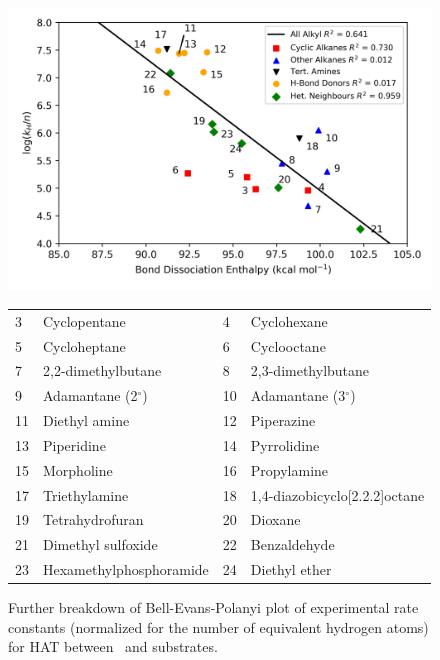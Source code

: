 \begin{figure}[!htbp]
  \centering
  \includegraphics[width=\textwidth]{figures/bep-breakdown}
  \begin{tabularx}{\textwidth}{| l X l X |}
    \hline
    3 & Cyclopentane & 4 & Cyclohexane \\
    5 & Cycloheptane & 6 & Cyclooctane \\
    7 & 2,2-dimethylbutane & 8 & 2,3-dimethylbutane \\
    9 & Adamantane (2$^\circ$) & 10 & Adamantane (3$^\circ$) \\
    11 & Diethyl amine & 12 & Piperazine \\
    13 & Piperidine & 14 & Pyrrolidine \\
    15 & Morpholine & 16 & Propylamine \\
    17 & Triethylamine & 18 & 1,4-diazobicyclo[2.2.2]octane \\
    19 & Tetrahydrofuran & 20 & Dioxane \\
    21 & Dimethyl sulfoxide & 22 & Benzaldehyde \\
    23 & Hexamethylphosphoramide & 24 & Diethyl ether \\
    \hline
  \end{tabularx}
  \caption[Further breakdown of Bell-Evans-Polanyi plot of experimental rate constants (normalized for the number of equivalent hydrogen atoms) for HAT between \cumo\ and alkyl substrates against BDEs calculated using the ROCBS-QB3 method.]{Further breakdown of Bell-Evans-Polanyi plot of experimental rate constants (normalized for the number of equivalent hydrogen atoms) for HAT between \cumo\ and  substrates.}
\label{fig:bep-breakdown}
\end{figure}

